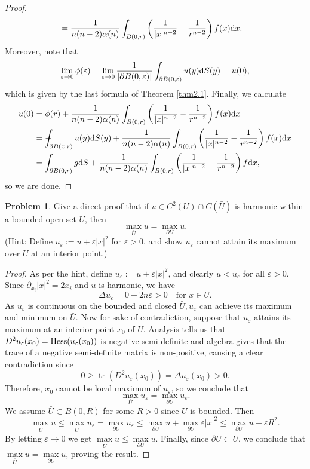 \documentclass[hyperref,UTF8,12pt]{article}
\numberwithin{equation}{subsection}
\theoremstyle{plain}
\theoremstyle{definition}
\newtheorem{problem}{Problem}
\numberwithin{theorem}{section}
\numberwithin{lemma}{section}
\numberwithin{proposition}{section}
\numberwithin{remark}{section}
\numberwithin{corollary}{section}
\numberwithin{definition}{section}
\numberwithin{problem}{section}
\numberwithin{example}{section}
\def\dif{\textup{d}}
\def\hess{\textup{Hess}}
\def\Xint#1{\mathchoice
	{\XXint\displaystyle\textstyle{#1}}%
	{\XXint\textstyle\scriptstyle{#1}}%
	{\XXint\scriptstyle\scriptscriptstyle{#1}}%
	{\XXint\scriptscriptstyle\scriptscriptstyle{#1}}%
	\!\int}
\def\XXint#1#2#3{{\setbox0=\hbox{$#1{#2#3}{\int}$ }
		\vcenter{\hbox{$#2#3$ }}\kern-.55\wd0}}
\def\dashint{\Xint-}
\newcommand{\ptl}{\partial}
\renewcommand{\leq}{\leqslant}
\renewcommand{\geq}{\geqslant}
\newcommand{\tr}{\operatorname{tr}}
\newcommand{\ve}{\varepsilon}
\begin{document}
\begin{proof}
\[\begin{aligned}
	&=\frac{1}{n(n-2)\alpha(n)}\int_{B(0,r)}\left(\frac{1}{|x|^{n-2}}-\frac{1}{r^{n-2}}\right)f(x)\dif x.
\end{aligned}\]Moreover, note that \[\lim_{\ve\to0}\phi(\ve)=\lim_{\ve\to0}\frac{1}{|\ptl B(0,\ve)|} \int_{\ptl B(0,\ve)}u(y)\dif S(y)=u(0),\]which is given by the last formula of Theorem \ref{thm2.1}. Finally, we calculate
\[\begin{aligned}
	u(0)&=\phi(r)+\frac{1}{n(n-2)\alpha(n)}\int_{B(0,r)}\left(\frac{1}{|x|^{n-2}}-\frac{1}{r^{n-2}}\right)f(x)\dif x\\
	&=\dashint_{\ptl B(x,r)}u(y)\dif S(y)+\frac{1}{n(n-2)\alpha(n)}\int_{B(0,r)} \left(\frac{1}{|x|^{n-2}}-\frac{1}{r^{n-2}}\right)f(x)\dif x\\
	&=\dashint_{\ptl B(0,r)}g\dif S+\frac{1}{n(n-2)\alpha(n)}\int_{B(0,r)} \left(\frac{1}{|x|^{n-2}}-\frac{1}{r^{n-2}}\right) f\dif x,
\end{aligned}\]so we are done.
\end{proof}
\begin{problem}\label{prob2.4}
Give a direct proof that if $u\in C^2(U)\cap C(\bar{U})$ is harmonic within a bounded open set $U$, then\[\max_{\bar{U}}u=\max_{\ptl U}u.\]
(Hint: Define $u_\ve:=u+\ve|x|^2$ for $\ve>0$, and show $u_\ve$ cannot attain its maximum over $\bar{U}$ at an interior point.)
\end{problem}
\begin{proof}
As per the hint, define $u_\ve:=u+\ve|x|^2$, and clearly $u<u_\ve$ for all $\ve>0$. Since $\ptl_{x_i}|x|^2=2x_i$ and $u$ is harmonic, we have \[\Delta u_\ve=0+2n\ve>0\quad\text{for } x\in U.\] As $u_\ve$ is continuous on the bounded and closed $\bar{U},u_\ve$ can achieve its maximum and minimum on $\bar{U}$. Now for sake of contradiction, suppose that $u_\ve$ attains its maximum at an interior point $x_0$ of $U$. Analysis tells us that $D^2u_\ve(x_0)=\hess(u_\ve(x_0))$ is negative semi-definite and algebra gives that the trace of a negative semi-definite matrix is non-positive, causing a clear contradiction since \[0\geq\tr(D^2u_\ve(x_0))=\Delta u_\ve(x_0)>0.\]
Therefore, $x_0$ cannot be local maximum of $u_\ve$, so we conclude that \[\max_{\bar{U}}u_\ve=\max_{\ptl U}u_\ve.\]
We assume $\bar{U}\subset B(0,R)$ for some $R>0$ since $U$ is bounded. Then\[\max_ {\bar{U}}u\leq\max_{\bar{U}}u_\ve=\max_{\ptl U}u_\ve\leq\max_{\ptl U}u+\max_ {\ptl U}\ve|x|^2\leq\max_{\ptl U}u+\ve R^2.\]By letting $\ve\to0$ we get $\max\limits_ {\bar{U}}u\leq\max\limits_{\ptl U}u$. Finally, since $\ptl U\subset\bar{U}$, we conclude that $\max\limits_{\bar{U}}u=\max\limits_{\ptl U}u$, proving the result.
\end{proof}
\end{document}
